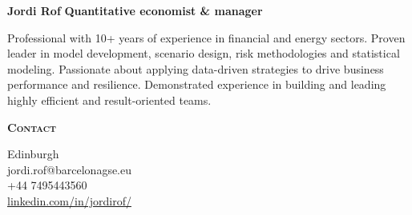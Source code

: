 \documentclass[11pt, a4paper]{article}
\newcommand{\headleft}[1]{\vspace*{3ex}\textsc{\textbf{#1}}\par
    \vspace*{-1.5ex}\hrulefill\par\vspace*{0.7ex}}
\begin{document}
\setlength{\topskip}{0pt}
\setlength{\parindent}{0pt}
\setlength{\parskip}{0pt}
\setlength{\fboxsep}{0pt}
\pagestyle{empty}
\raggedbottom

\begin{minipage}[t]{0.33\textwidth}

\colorbox{cvblue!90}{\begin{minipage}[t][5mm][t]{\textwidth}\null\hfill\null\end{minipage}}

\vspace{-.2ex} %
\colorbox{cvblue!90}{\color{white} %
\textwidth\relax  %
\begin{minipage}[t][293mm][t]{0.82\textwidth}
\raggedright
\vspace*{2.5ex}

\Huge \textbf{Jordi Rof}
\Large \textbf{Quantitative economist \& manager}
\normalsize 

\vspace*{2.5ex}  

\begin{minipage}{\textwidth}    
Professional with 10+ years of experience in financial and energy sectors. Proven leader in model development, scenario design, risk methodologies and statistical modeling. Passionate about applying data-driven strategies to drive business performance and resilience. Demonstrated experience in building and leading highly efficient and result-oriented teams. 
\end{minipage}

\headleft{Contact}
\makebox[1.5em][c]{\faMapMarker} Edinburgh \\[0.4ex]
\makebox[1.5em][c]{\faEnvelope}  jordi.rof@barcelonagse.eu \\[0.4ex]
\makebox[1.5em][c]{\faPhone} +44 7495443560 \\[0.4ex]
\makebox[1.5em][c]{\faLinkedinSquare} \href{https://www.linkedin.com/in/jordirof/}{linkedin.com/in/jordirof/} \\[0.1ex]
\normalsize


\end{minipage}}
\end{minipage}
\end{document}
